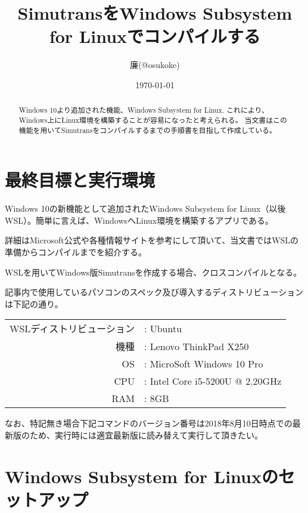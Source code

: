 \documentclass[autodetect-engine,dvipdfmx-if-dvi,ja=standard,a4j]{bxjsarticle}
\title{SimutransをWindows Subsystem for Linuxでコンパイルする}
\author{廉(@osukoke)}
\date{\today}
\begin{document}
	\maketitle
	\begin{abstract}
		Windows 10より追加された機能、Windows Subsystem for Linux.
		これにより、Windows上にLinux環境を構築することが容易になったと考えられる。
		当文書はこの機能を用いてSimutransをコンパイルするまでの手順書を目指して作成している。
	\end{abstract}
	\section{最終目標と実行環境}
		Windows 10の新機能として追加されたWindows Subsystem for Linux（以後WSL）。簡単に言えば、WindowsへLinux環境を構築するアプリである。\par \noindent
		詳細はMicrosoft公式や各種情報サイトを参考にして頂いて、当文書ではWSLの準備からコンパイルまでを紹介する。\par
		WSLを用いてWindows版Simutransを作成する場合、クロスコンパイルとなる。\par
		記事内で使用しているパソコンのスペック及び導入するディストリビューションは下記の通り。\par\noindent
			\begin{tabular}{rl}
				WSLディストリビューション & : Ubuntu \\
				機種 & : Lenovo ThinkPad X250 \\
				OS & : MicroSoft Windows 10 Pro \\
				CPU & : Intel Core i5-5200U @ 2.20GHz \\
				RAM & : 8GB \\
			\end{tabular}
	\par
		なお、特記無き場合下記コマンドのバージョン番号は2018年8月10日時点での最新版のため、実行時には適宜最新版に読み替えて実行して頂きたい。\par
	\section{Windows Subsystem for Linuxのセットアップ}
\end{document}
